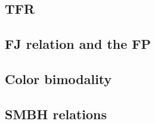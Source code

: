 \subsection{TFR}

\subsection{FJ relation and the FP}



\subsection{Color bimodality}

\subsection{SMBH relations}